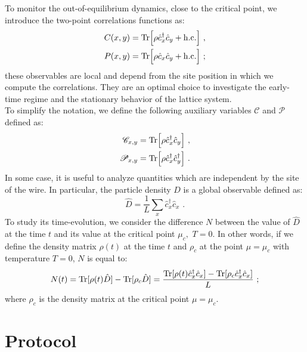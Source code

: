 \documentclass[pra,twocolumn,preprintnumbers,amsmath,amssymb,nofootinbib,floatfix,longbibliography]{revtex4}
\begin{document}
To monitor the out-of-equilibrium dynamics, close to the
critical point, we introduce the two-point correlations
functions as:
\begin{align}
  \label{Ccorrs}
  C(x,y) &={\rm Tr}\Bigr[\rho \hat c^\dagger_x \hat c_y
						+  {\rm h.c.}\Bigr]\,\,,\\
  \label{Pcorrs}
  P(x,y) &={\rm Tr}\Bigr[\rho \hat c_x\hat c_y +
    {\rm h.c.}\Bigr] \,\,;
\end{align}
these observables are local and depend from the site
position in which we compute the correlations. They are an
optimal choice to investigate the early-time regime and the
stationary behavior of the lattice system. \\
To simplify the notation, we define the following auxiliary
variables $\mathscr{C}$ and $\mathscr{P}$ defined as:
\begin{align}
  \label{RedCorr}
  \mathscr{C}_{x,y} &= {\rm Tr}\Bigr[\rho \hat c^\dagger_x
    \hat c_y\Bigr]\,\,,\\
  \mathscr{P}_{x,y} &= {\rm Tr}\Bigr[\rho \hat c^\dagger_x
    \hat c^\dagger_y\Bigr]\,\,.
\end{align}
In some case, it is useful to analyze quantities which are
independent by the site of the wire. In particular, the
particle density $D$ is a global observable defined as:
\begin{equation}
  \label{partdens}
  \hat D = \frac{1}{L}
  \sum _x \hat c_x^\dagger \hat c_x \,\,.
\end{equation}
To study its time-evolution, we consider the difference $N$
between the value of $\hat D$ at the time $t$ and its value
at the critical point $\mu_c,\,\,T=0$. In other words, if
we define the density matrix $\rho(t)$ at the time $t$ and
$\rho_c$ at the point $\mu = \mu_c$ with temperature $T=0$,
$N$ is equal to:
\begin{equation}
  \label{Nobs}
  N(t) = {\rm Tr}[\rho(t)\hat D]- {\rm Tr}[\rho_c \hat D]
  =\frac{{\rm Tr}[\rho(t)\hat c_x^\dagger \hat c_x] -
      {\rm Tr}[\rho_c \hat c_x^\dagger \hat c_x]}{L} \,\,;
\end{equation}
where $\rho_c$ is the density matrix at the critical point
$\mu=\mu_c$.

\section{Protocol}
\end{document}
